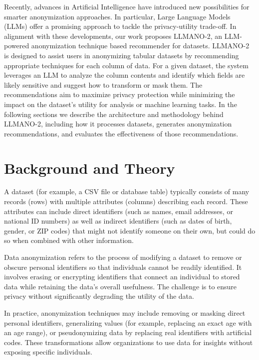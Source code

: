 \documentclass{article}
\begin{document}
Recently, advances in Artificial Intelligence have introduced new possibilities for smarter anonymization approaches. In particular, Large Language Models (LLMs) offer a promising approach to tackle the privacy-utility trade-off. In alignment with these developments, our work proposes LLMANO-2, an LLM-powered anonymization technique based recommender for datasets. LLMANO-2 is designed to assist users in anonymizing tabular datasets by recommending appropriate techniques for each column of data. For a given dataset, the system leverages an LLM to analyze the column contents and identify which fields are likely sensitive and suggest how to transform or mask them. The recommendations aim to maximize privacy protection while minimizing the impact on the dataset’s utility for analysis or machine learning tasks. In the following sections we describe the architecture and methodology behind LLMANO-2, including how it processes datasets, generates anonymization recommendations, and evaluates the effectiveness of those recommendations.


\section{Background and Theory}

A dataset (for example, a CSV file or database table) typically consists of many records (rows) with multiple attributes (columns) describing each record. These attributes can include direct identifiers (such as names, email addresses, or national ID numbers) as well as indirect identifiers (such as dates of birth, gender, or ZIP codes) that might not identify someone on their own, but could do so when combined with other information.

Data anonymization refers to the process of modifying a dataset to remove or obscure personal identifiers so that individuals cannot be readily identified. It involves erasing or encrypting identifiers that connect an individual to stored data while retaining the data’s overall usefulness. The challenge is to ensure privacy without significantly degrading the utility of the data.

In practice, anonymization techniques may include removing or masking direct personal identifiers, generalizing values (for example, replacing an exact age with an age range), or pseudonymizing data by replacing real identifiers with artificial codes. These transformations allow organizations to use data for insights without exposing specific individuals.
\end{document}

